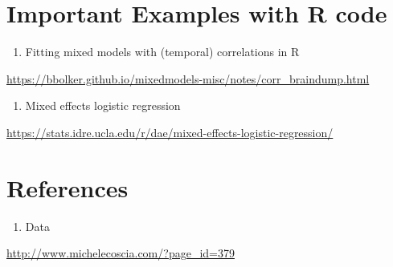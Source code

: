 \documentclass[]{book}
\providecommand{\tightlist}{%
  \setlength{\itemsep}{0pt}\setlength{\parskip}{0pt}}
\begin{document}
\section{Important Examples with R
code}\label{important-examples-with-r-code}

\begin{enumerate}
\def\labelenumi{\arabic{enumi}.}
\tightlist
\item
  Fitting mixed models with (temporal) correlations in R
\end{enumerate}

\url{https://bbolker.github.io/mixedmodels-misc/notes/corr_braindump.html}

\begin{enumerate}
\def\labelenumi{\arabic{enumi}.}
\setcounter{enumi}{1}
\tightlist
\item
  Mixed effects logistic regression
\end{enumerate}

\url{https://stats.idre.ucla.edu/r/dae/mixed-effects-logistic-regression/}

\section{References}\label{references-4}

\begin{enumerate}
\def\labelenumi{\arabic{enumi}.}
\tightlist
\item
  Data
\end{enumerate}

\url{http://www.michelecoscia.com/?page_id=379}


\end{document}
